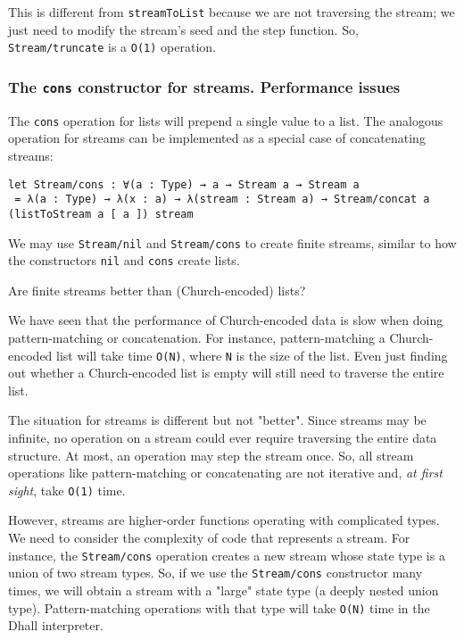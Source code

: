 This is different from \lstinline!streamToList! because we are not traversing the stream; we just need to modify the stream's seed and the step function.
So, \lstinline!Stream/truncate! is a \lstinline!O(1)! operation.


\subsubsection{The \lstinline!cons! constructor for streams. Performance issues}


The \lstinline!cons! operation for lists will prepend a single value to a list.
The analogous operation for streams can be implemented as a special case of concatenating streams:


\begin{lstlisting}[language=Dhall]
let Stream/cons : ∀(a : Type) → a → Stream a → Stream a
 = λ(a : Type) → λ(x : a) → λ(stream : Stream a) → Stream/concat a (listToStream a [ a ]) stream
\end{lstlisting}


We may use \lstinline!Stream/nil! and \lstinline!Stream/cons! to create finite streams, similar to how the constructors \lstinline!nil! and \lstinline!cons! create lists.


Are finite streams better than (Church-encoded) lists?


We have seen that the performance of Church-encoded data is slow when doing pattern-matching or concatenation.
For instance, pattern-matching a Church-encoded list will take time \lstinline!O(N)!, where \lstinline!N! is the size of the list.
Even just finding out whether a Church-encoded list is empty will still need to traverse the entire list.


The situation for streams is different but not "better".
Since streams may be infinite, no operation on a stream could ever require traversing the entire data structure.
At most, an operation may step the stream once.
So, all stream operations like pattern-matching or concatenating are not iterative and, \emph{at first sight}, take \lstinline!O(1)! time.


However, streams are higher-order functions operating with complicated types.
We need to consider the complexity of code that represents a stream.
For instance, the \lstinline!Stream/cons! operation creates a new stream whose state type is a union of two stream types.
So, if we use the \lstinline!Stream/cons! constructor many times, we will obtain a stream with a "large" state type (a deeply nested union type).
Pattern-matching operations with that type will take \lstinline!O(N)! time in the Dhall interpreter.


